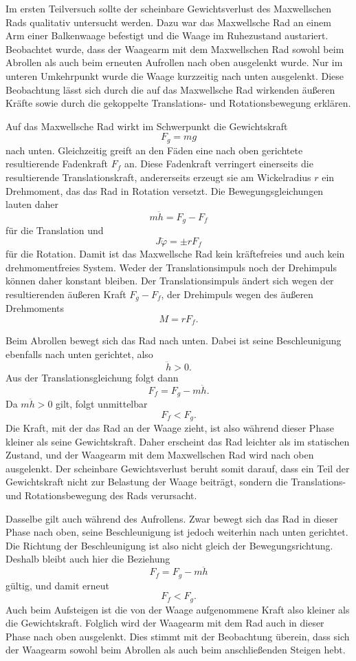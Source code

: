 \documentclass{report}
\begin{document}
Im ersten Teilversuch sollte der scheinbare Gewichtsverlust des Maxwellschen Rads qualitativ untersucht werden. Dazu war das Maxwellsche Rad an einem Arm einer Balkenwaage befestigt und die Waage im Ruhezustand austariert. Beobachtet wurde, dass der Waagearm mit dem Maxwellschen Rad sowohl beim Abrollen als auch beim erneuten Aufrollen nach oben ausgelenkt wurde. Nur im unteren Umkehrpunkt wurde die Waage kurzzeitig nach unten ausgelenkt. Diese Beobachtung lässt sich durch die auf das Maxwellsche Rad wirkenden äußeren Kräfte sowie durch die gekoppelte Translations- und Rotationsbewegung erklären.

\noindent
Auf das Maxwellsche Rad wirkt im Schwerpunkt die Gewichtskraft
\[
F_g = mg
\]
nach unten. Gleichzeitig greift an den Fäden eine nach oben gerichtete resultierende Fadenkraft \(F_f\) an. Diese Fadenkraft verringert einerseits die resultierende Translationskraft, andererseits erzeugt sie am Wickelradius \(r\) ein Drehmoment, das das Rad in Rotation versetzt. Die Bewegungsgleichungen lauten daher
\[
m\ddot h = F_g - F_f
\]
für die Translation und
\[
J\ddot\varphi = \pm rF_f
\]
für die Rotation. Damit ist das Maxwellsche Rad kein kräftefreies und auch kein drehmomentfreies System. Weder der Translationsimpuls noch der Drehimpuls können daher konstant bleiben. Der Translationsimpuls ändert sich wegen der resultierenden äußeren Kraft \(F_g-F_f\), der Drehimpuls wegen des äußeren Drehmoments
\[
M = rF_f.
\]


\noindent
Beim Abrollen bewegt sich das Rad nach unten. Dabei ist seine Beschleunigung ebenfalls nach unten gerichtet, also
\[
\ddot h > 0.
\]
Aus der Translationsgleichung folgt dann
\[
F_f = F_g - m\ddot h.
\]
Da \(m\ddot h > 0\) gilt, folgt unmittelbar
\[
F_f < F_g.
\]
Die Kraft, mit der das Rad an der Waage zieht, ist also während dieser Phase kleiner als seine Gewichtskraft. Daher erscheint das Rad leichter als im statischen Zustand, und der Waagearm mit dem Maxwellschen Rad wird nach oben ausgelenkt. Der scheinbare Gewichtsverlust beruht somit darauf, dass ein Teil der Gewichtskraft nicht zur Belastung der Waage beiträgt, sondern die Translations- und Rotationsbewegung des Rads verursacht. 

\noindent
Dasselbe gilt auch während des Aufrollens. Zwar bewegt sich das Rad in dieser Phase nach oben, seine Beschleunigung ist jedoch weiterhin nach unten gerichtet. Die Richtung der Beschleunigung ist also nicht gleich der Bewegungsrichtung. Deshalb bleibt auch hier die Beziehung
\[
F_f = F_g - m\ddot h
\]
gültig, und damit erneut
\[
F_f < F_g.
\]
Auch beim Aufsteigen ist die von der Waage aufgenommene Kraft also kleiner als die Gewichtskraft. Folglich wird der Waagearm mit dem Rad auch in dieser Phase nach oben ausgelenkt. Dies stimmt mit der Beobachtung überein, dass sich der Waagearm sowohl beim Abrollen als auch beim anschließenden Steigen hebt. 
\end{document}

